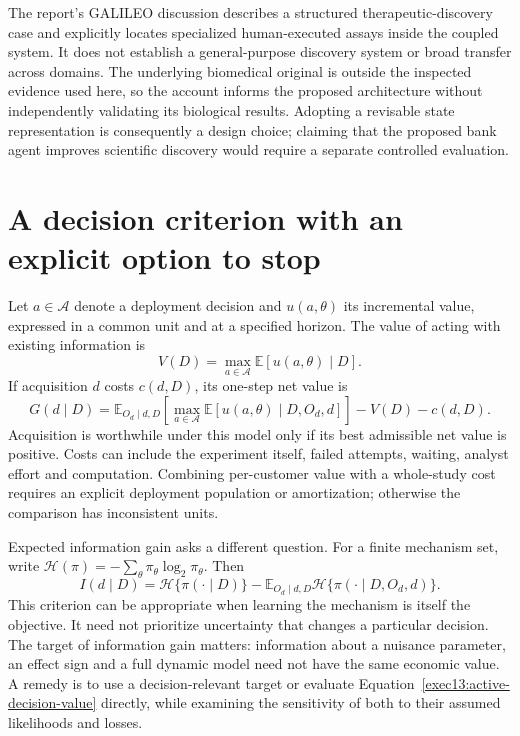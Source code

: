The report's GALILEO discussion describes a structured therapeutic-discovery
case and explicitly locates specialized human-executed assays inside the
coupled system. It does not establish a general-purpose discovery system or
broad transfer across domains. The underlying biomedical original is outside
the inspected evidence used here, so the account informs the proposed
architecture without independently validating its biological results.
Adopting a revisable state representation is consequently a design choice;
claiming that the proposed bank agent improves scientific discovery would
require a separate controlled evaluation.

\section{A decision criterion with an explicit option to stop}

Let $a\in\mathcal A$ denote a deployment decision and $u(a,\theta)$ its
incremental value, expressed in a common unit and at a specified horizon.
The value of acting with existing information is
\[
 V(D)=\max_{a\in\mathcal A}\mathbb E[u(a,\theta)\mid D].
\]
If acquisition $d$ costs $c(d,D)$, its one-step net value is
\begin{equation}
 G(d\mid D)=\mathbb E_{O_d\mid d,D}
   \left[\max_{a\in\mathcal A}
   \mathbb E[u(a,\theta)\mid D,O_d,d]\right]-V(D)-c(d,D).
 \label{exec13:active-decision-value}
\end{equation}
Acquisition is worthwhile under this model only if its best admissible net
value is positive. Costs can include the experiment itself, failed attempts,
waiting, analyst effort and computation. Combining per-customer value with a
whole-study cost requires an explicit deployment population or amortization;
otherwise the comparison has inconsistent units.

Expected information gain asks a different question. For a finite mechanism
set, write $\mathcal H(\pi)=-\sum_\theta\pi_\theta\log_2\pi_\theta$.
Then
\[
 I(d\mid D)=\mathcal H\{\pi(\cdot\mid D)\}
  -\mathbb E_{O_d\mid d,D}\mathcal H\{\pi(\cdot\mid D,O_d,d)\}.
\]
This criterion can be appropriate when learning the mechanism is itself the
objective. It need not prioritize uncertainty that changes a particular
decision. The target of information gain matters: information about a nuisance
parameter, an effect sign and a full dynamic model need not have the same
economic value. A remedy is to use a decision-relevant target or evaluate
Equation~\eqref{exec13:active-decision-value} directly, while examining the
sensitivity of both to their assumed likelihoods and losses.

